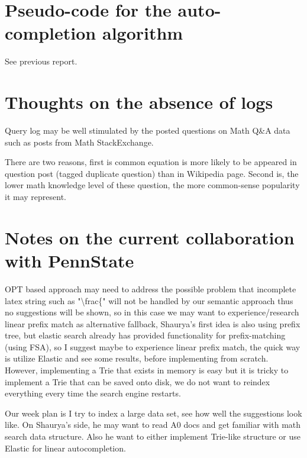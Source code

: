 \documentclass[12pt]{article} %
\begin{document}
\section*{Pseudo-code for the auto-completion algorithm}
See previous report.

\section*{Thoughts on the absence of logs}
Query log may be well stimulated by the posted questions on Math Q\&A data such as posts from Math StackExchange.

There are two reasons, first is common equation is more likely to be appeared in question post (tagged duplicate question) than in Wikipedia page.
Second is, the lower math knowledge level of these question, the more common-sense popularity it may represent.

\section*{Notes on the current collaboration with PennState}
OPT based approach may need to address the possible problem that incomplete latex string such as "\textbackslash frac\{" will not be handled by our semantic approach thus no suggestions will be shown, so in this case we may want to experience/research linear prefix match as alternative fallback, Shaurya's first idea is also using prefix tree, but elastic search already has provided functionality for prefix-matching (using FSA), so I suggest maybe to experience linear prefix match, the quick way is utilize Elastic and see some results, before implementing from scratch.
However, implementing a Trie that exists in memory is easy but it is tricky to implement a Trie that can be saved onto disk, we do not want to reindex everything every time the search engine restarts.

Our week plan is I try to index a large data set, see how well the suggestions look like.
On Shaurya's side, he may want to read A0 docs and get familiar with math search data structure. Also he want to either implement Trie-like structure or use Elastic for linear autocompletion.
\end{document}
